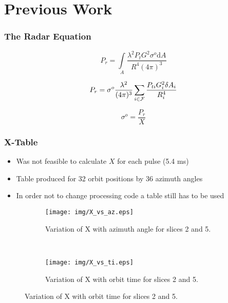 \documentclass[10pt]{beamer}
\begin{document}
\section{Previous Work}


\begin{frame}
  \frametitle{The Radar Equation}

  \begin{equation}
    P_r = \int \limits_A 
    \frac{\lambda^2 P_{t}G^2 \sigma^o \mathrm{d}A }{R^4 (4\pi)^3}
  \end{equation}
  
  \begin{equation}
    P_r =\sigma^o \frac{\lambda^2 }{(4\pi )^3} \sum_{i\in \cal{F}} 
    \frac{P_{ti}G_i^2  \delta A_i}{R_i^4}
  \end{equation}
  
  \begin{equation}
    \sigma^o=\frac{P_r}{X}
  \end{equation}
  
\end{frame}

\begin{frame}
  \frametitle{X-Table}
    \begin{itemize}
    \item Was not feasible to calculate $X$ for each pulse (5.4 ms)
    \item Table produced for 32 orbit positions by 36 azimuth angles
    \item In order not to change processing code a table still has to be used
    \end{itemize}
  
    \begin{figure}[h]
      \begin{subfigure}[h]{0.4\textwidth}
        \centering
        \texttt{[image: img/X\_vs\_az.eps]}
        \caption{Variation of X with azimuth angle for slices 2 and 5.}
      \end{subfigure}
      ~
      \begin{subfigure}[h]{0.4\textwidth}
        \centering
        \texttt{[image: img/X\_vs\_ti.eps]}
        \caption{Variation of X with orbit time for slices 2 and 5.}
      \end{subfigure}
      \label{filter}
    \end{figure}
  
\end{frame}
\end{document}
